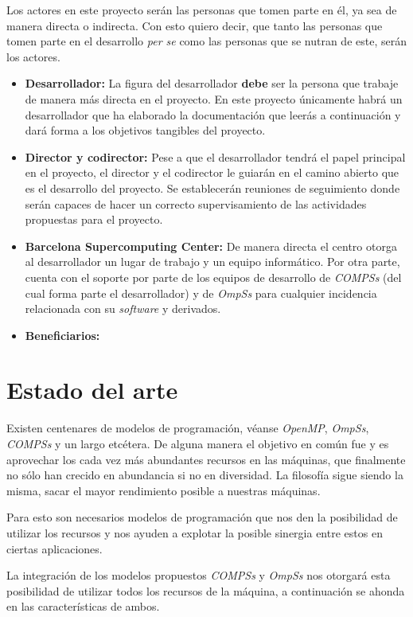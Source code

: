 \documentclass{article}
\begin{document}
Los actores en este proyecto serán las personas que tomen parte en él, ya sea de manera directa o indirecta. Con esto quiero decir, que tanto las personas que tomen parte en el desarrollo \textit{per se} como las personas que se nutran de este, serán los actores.

\begin{itemize}
 \item \textbf{Desarrollador:} La figura del desarrollador \textbf{debe} ser la persona que trabaje de manera más directa en el proyecto. En este proyecto únicamente habrá un desarrollador que ha elaborado la documentación que leerás a continuación y dará forma a los objetivos tangibles del proyecto.  
 \item \textbf{Director y codirector:} Pese a que el desarrollador tendrá el papel principal en el proyecto, el director y el codirector le guiarán en el camino abierto que es el desarrollo del proyecto. Se establecerán reuniones de seguimiento donde serán capaces de hacer un correcto supervisamiento de las actividades propuestas para el proyecto.
 \item \textbf{Barcelona Supercomputing Center:} De manera directa el centro otorga al desarrollador un lugar de trabajo y un equipo informático. Por otra parte, cuenta con el soporte por parte de los equipos de desarrollo de \textit{COMPSs} (del cual forma parte el desarrollador) y de \textit{OmpSs} para cualquier incidencia relacionada con su \textit{software} y derivados.
 \item \textbf{Beneficiarios:} %
 
\end{itemize}

\section{Estado del arte}

Existen centenares de modelos de programación, véanse \textit{OpenMP}, \textit{OmpSs}, \textit{COMPSs} y un largo etcétera. De alguna manera el objetivo en común fue y es aprovechar los cada vez más abundantes recursos en las máquinas, que finalmente no sólo han crecido en abundancia si no en diversidad. La filosofía sigue siendo la misma, sacar el mayor rendimiento posible a nuestras máquinas. \par\bigskip

Para esto son necesarios modelos de programación que nos den la posibilidad de utilizar los recursos y nos ayuden a explotar la posible sinergia entre estos en ciertas aplicaciones. 
\par\bigskip
La integración de los modelos propuestos \textit{COMPSs} y \textit{OmpSs} nos otorgará esta posibilidad de utilizar todos los recursos de la máquina, a continuación se ahonda en las características de ambos.
\end{document}
